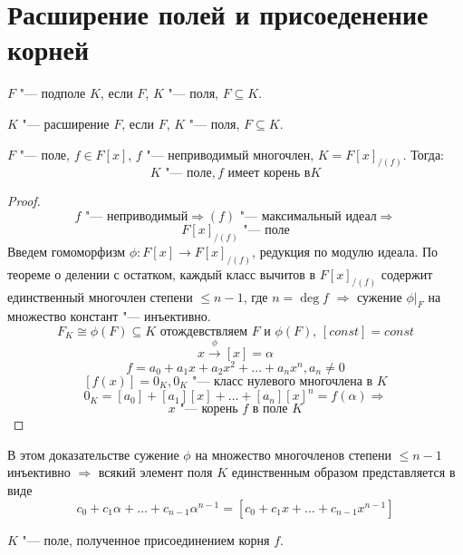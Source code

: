 ﻿\section{Расширение полей и присоеденение корней}
\begin{Def}
$F$ "--- подполе $K$, если $F$, $K$ "--- поля, $F \subseteq K$.
\end{Def}
\begin{Def}
$K$ "--- расширение $F$, если $F$, $K$ "--- поля, $F \subseteq K$.
\end{Def}
\begin{theorem}
$F$ "--- поле, $f \in F[x]$, $f$ "--- неприводимый многочлен, $K = F[x]_{/(f)}$. Тогда: 
$$K \text{ "--- поле}, f \text{ имеет корень в} K$$
\end{theorem}
\begin{proof}
$$f \text{ "--- неприводимый} \Rightarrow (f) \text{ "--- максимальный идеал} \Rightarrow$$
$$F[x]_{/(f)} \text{ "--- поле}$$
Введем гомоморфизм $\phi \colon F[x] \rightarrow F[x]_{/(f)}$, редукция по модулю идеала.
По теореме о делении с остатком, каждый класс вычитов в $F[x]_{/(f)}$ содержит единственный многочлен степени $\leq n - 1$, где $n = \deg f$ $\Rightarrow$ сужение $\phi|_{F}$ на множество констант "--- инъективно.
$$F_K \cong \phi(F) \subseteq K \text{ отождевствляем $F$ и $\phi(F)$, $[const] = const$}$$
$$x \xrightarrow{\phi} [x] = \alpha$$
$$f = a_0 + a_1x + a_2x^2 + \dots + a_nx^n, a_n \neq 0$$
$$[f(x)] = 0_K, 0_K \text{ "--- класс нулевого многочлена в $K$}$$
$$0_K = [a_0] + [a_1][x] + \dots + [a_n][x]^n = f(\alpha) \Rightarrow$$
$$x \text{ "--- корень $f$ в поле $K$}$$
\end{proof}
\begin{Rem}
В этом доказательстве сужение $\phi$ на множество многочленов степени $\leq n - 1$ инъективно $\Rightarrow$ всякий элемент поля $K$ единственным образом представляется в виде $$c_0 + c_1\alpha + \dots + c_{n - 1}\alpha^{n - 1} = [c_0 + c_1x + \dots + c_{n - 1}x^{n - 1}]$$
\end{Rem}
\begin{Def}
$K$ "--- поле, полученное присоединением корня $f$.
\end{Def}


